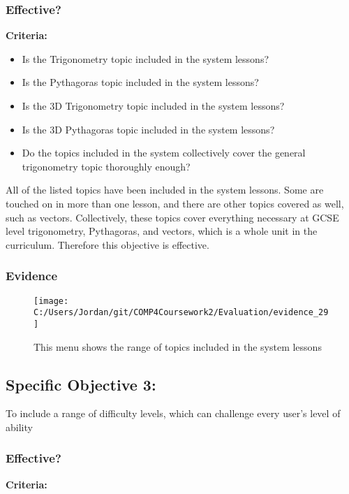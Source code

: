 \subsubsection{Effective?}

\textbf{Criteria: }

\begin{itemize}
	\item Is the Trigonometry topic included in the system lessons?
	\item Is the Pythagoras topic included in the system lessons?
	\item Is the 3D Trigonometry topic included in the system lessons?
	\item Is the 3D Pythagoras topic included in the system lessons?
	\item Do the topics included in the system collectively cover the general trigonometry topic thoroughly enough?
\end{itemize}

All of the listed topics have been included in the system lessons. Some are touched on in more than one lesson, and there are other topics covered as well, such as vectors. Collectively, these topics cover everything necessary at GCSE level trigonometry, Pythagoras, and vectors, which is a whole unit in the curriculum. Therefore this objective is effective.

\subsubsection{Evidence}

\begin{figure}[H]
	\texttt{[image: C:/Users/Jordan/git/COMP4Coursework2/Evaluation/evidence\_29]}
	\caption{This menu shows the range of topics included in the system lessons}
\end{figure}

\subsection{Specific Objective 3: }

To include a range of difficulty levels, which can challenge every user's level of ability

\subsubsection{Effective?}

\textbf{Criteria: }

